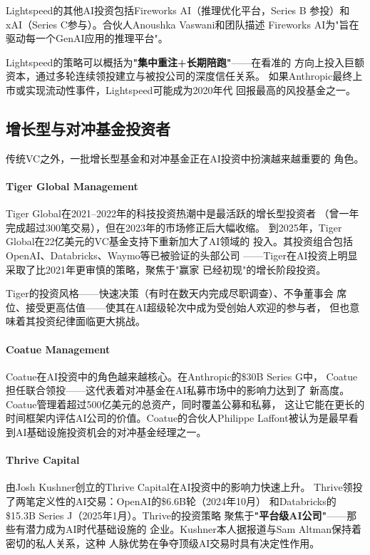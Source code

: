 Lightspeed的其他AI投资包括Fireworks AI（推理优化平台，Series B
参投）和xAI（Series C参与）。合伙人Anoushka Vaswani和团队描述
Fireworks AI为"旨在驱动每一个GenAI应用的推理平台"。

Lightspeed的策略可以概括为\textbf{"集中重注+长期陪跑"}——在看准的
方向上投入巨额资本，通过多轮连续领投建立与被投公司的深度信任关系。
如果Anthropic最终上市或实现流动性事件，Lightspeed可能成为2020年代
回报最高的风投基金之一。

\subsection{增长型与对冲基金投资者}
\label{subsec:fund-growth}

传统VC之外，一批增长型基金和对冲基金正在AI投资中扮演越来越重要的
角色。

\paragraph{Tiger Global Management}

Tiger Global在2021--2022年的科技投资热潮中是最活跃的增长型投资者
（曾一年完成超过300笔交易），但在2023年的市场修正后大幅收缩。
到2025年，Tiger Global在22亿美元的VC基金支持下重新加大了AI领域的
投入。其投资组合包括OpenAI、Databricks、Waymo等已被验证的头部公司
——Tiger在AI投资上明显采取了比2021年更审慎的策略，聚焦于"赢家
已经初现"的增长阶段投资。

Tiger的投资风格——快速决策（有时在数天内完成尽职调查）、不争董事会
席位、接受更高估值——使其在AI超级轮次中成为受创始人欢迎的参与者，
但也意味着其投资纪律面临更大挑战。

\paragraph{Coatue Management}

Coatue在AI投资中的角色越来越核心。在Anthropic的\$30B Series G中，
Coatue担任联合领投——这代表着对冲基金在AI私募市场中的影响力达到了
新高度。Coatue管理着超过500亿美元的总资产，同时覆盖公募和私募，
这让它能在更长的时间框架内评估AI公司的价值。Coatue的合伙人Philippe
Laffont被认为是最早看到AI基础设施投资机会的对冲基金经理之一。

\paragraph{Thrive Capital}

由Josh Kushner创立的Thrive Capital在AI投资中的影响力快速上升。
Thrive领投了两笔定义性的AI交易：OpenAI的\$6.6B轮（2024年10月）
和Databricks的\$15.3B Series J（2025年1月）。Thrive的投资策略
聚焦于\textbf{"平台级AI公司"}——那些有潜力成为AI时代基础设施的
企业。Kushner本人据报道与Sam Altman保持着密切的私人关系，这种
人脉优势在争夺顶级AI交易时具有决定性作用。

